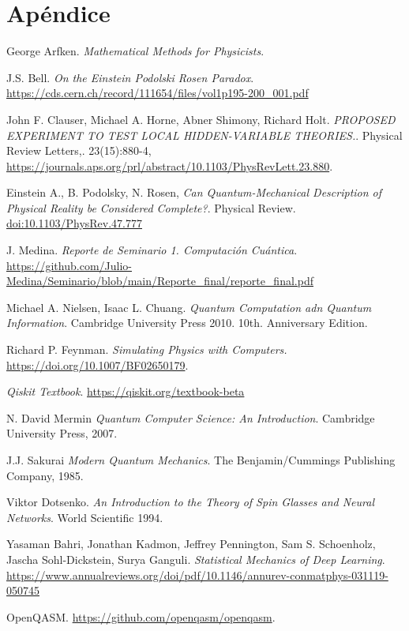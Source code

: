 \documentclass[a4paper]{article}
\begin{document}
\section{Apéndice}\label{sec::appendix}
\begin{thebibliography}{99}
 George Arfken. \textit{Mathematical Methods for Physicists}.

 J.S. Bell. \textit{On the Einstein Podolski Rosen Paradox}. \url{https://cds.cern.ch/record/111654/files/vol1p195-200_001.pdf}

 John F. Clauser, Michael A. Horne, Abner Shimony, Richard Holt. \textit{PROPOSED EXPERIMENT TO TEST LOCAL HIDDEN-VARIABLE THEORIES.}. Physical Review Letters,. 23(15):880-4, \url{https://journals.aps.org/prl/abstract/10.1103/PhysRevLett.23.880}.

 Einstein A., B. Podolsky, N. Rosen, \textit{Can Quantum-Mechanical Description of Physical Reality be Considered Complete?}. Physical Review. \url{doi:10.1103/PhysRev.47.777}

 J. Medina. \textit{Reporte de Seminario 1. Computación Cuántica}. \url{https://github.com/Julio-Medina/Seminario/blob/main/Reporte_final/reporte_final.pdf}

 Michael A. Nielsen, Isaac L. Chuang. \textit{Quantum Computation adn Quantum Information}. Cambridge University Press 2010. 10th. Anniversary Edition.

 Richard P. Feynman. \textit{Simulating Physics with Computers.} \url{https://doi.org/10.1007/BF02650179}.

 \textit{Qiskit Textbook}. \url{https://qiskit.org/textbook-beta}

 N. David Mermin \textit{Quantum Computer Science: An Introduction}. Cambridge University Press, 2007.

 J.J. Sakurai \textit{Modern Quantum Mechanics}. The Benjamin/Cummings Publishing Company, 1985.

 Viktor Dotsenko. \textit{An Introduction to the Theory of Spin Glasses and Neural Networks}. World Scientific 1994.

 Yasaman Bahri, Jonathan Kadmon, Jeffrey Pennington, Sam S. Schoenholz, Jascha Sohl-Dickstein, Surya Ganguli. \textit{Statistical Mechanics of Deep Learning}. \url{https://www.annualreviews.org/doi/pdf/10.1146/annurev-conmatphys-031119-050745}

 OpenQASM. \url{https://github.com/openqasm/openqasm}.
 

\end{thebibliography}
\end{document}
